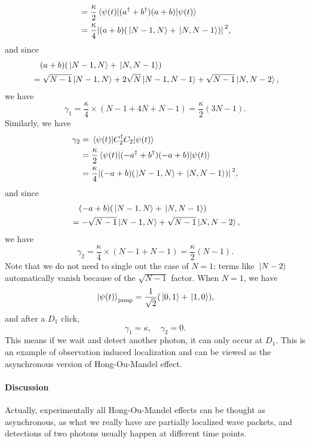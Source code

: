 \documentclass[hyperref, a4paper]{article}
\begin{document}
\begin{itemize}
\[\begin{aligned}
        &= \frac{\kappa}{2}  \expval{(a^\dagger + b^\dagger) (a + b)}{\psi(t)}  \\
        &= \frac{\kappa}{4} \abs*{(a + b) (\ket*{N-1, N} + \ket*{N, N-1})}^2,
    \end{aligned}
\]
and since 
\[
    \begin{aligned}
        &\quad (a + b) (\ket*{N-1, N} + \ket*{N, N-1}) \\
        &= \sqrt{N-1} \ket*{N-1, N} + 2 \sqrt{N} \ket*{N-1, N-1} + \sqrt{N-1} \ket*{N, N-2},
    \end{aligned}
\]
we have 
\begin{equation}
    \gamma_1 = \frac{\kappa}{4} \times (N-1 + 4 N + N-1) = \frac{\kappa}{2} (3N-1).
\end{equation}
Similarly, we have 
\[
    \begin{aligned}
        \gamma_2 &= \expval{C_2^\dagger C_2}{\psi(t)} \\
        &= \frac{\kappa}{2}  \expval{(- a^\dagger + b^\dagger) (- a + b)}{\psi(t)}  \\
        &= \frac{\kappa}{4} \abs*{(- a + b) (\ket*{N-1, N} + \ket*{N, N-1})}^2,
    \end{aligned}
\]
and since 
\[
    \begin{aligned}
        &\quad (- a + b) (\ket*{N-1, N} + \ket*{N, N-1}) \\
        &= - \sqrt{N-1} \ket*{N-1, N} + \sqrt{N-1} \ket*{N, N-2},
    \end{aligned}
\]
we have 
\begin{equation}
    \gamma_2 = \frac{\kappa}{4} \times (N-1 + N - 1) = \frac{\kappa}{2} (N-1).
\end{equation}
Note that we do not need to single out the case of $N=1$: terms like $\ket*{N-2}$ automatically vanish because 
of the $\sqrt{N-1}$ factor. When $N=1$, we have 
\begin{equation}
    \ket*{\psi(t)}_\text{jump} = \frac{1}{\sqrt{2}} (\ket*{0, 1} + \ket*{1, 0}),
\end{equation}
and after a $D_1$ click, 
\begin{equation}
    \gamma_1 = \kappa, \quad \gamma_2 = 0.
\end{equation}
This means if we wait and detect another photon, it can only occur at $D_1$. This is an example of observation
induced localization and can be viewed as the asynchronous version of Hong-Ou-Mandel effect. 
\end{itemize}

\paragraph{Discussion} Actually, experimentally all Hong-Ou-Mandel effects can be thought as asynchronous,
as what we really have are partially localized wave packets, and detections of two photons usually happen
at different time points.
\end{document}
